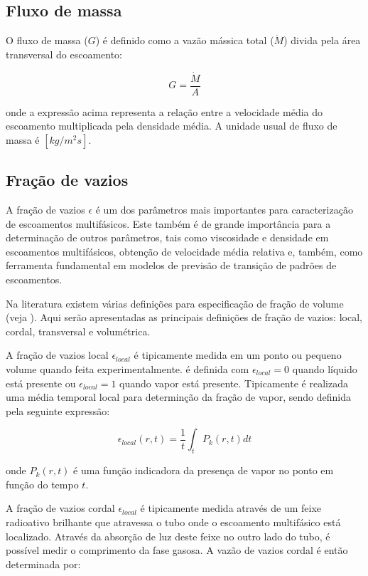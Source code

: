 \subsection{Fluxo de massa}

O fluxo de massa ($G$) é definido como a vazão mássica total ($\dot{M}$)
divida pela área transversal do escoamento:

\begin{equation}
	G = \frac{\dot{M}}{A}
\end{equation}

\noindent onde a expressão acima representa a relação entre a velocidade
média do escoamento multiplicada pela densidade média. A unidade usual
de fluxo de massa é $[kg/m^2 s]$.

\subsection{Fração de vazios}

A fração de vazios $\epsilon$ é um dos parâmetros mais importantes para
caracterização de escoamentos multifásicos. Este também é de grande
importância para a determinação de outros parâmetros, tais como
viscosidade e densidade em escoamentos multifásicos, obtenção de
velocidade média relativa e, também, como ferramenta fundamental em
modelos de previsão de transição de padrões de escoamentos. 

Na literatura existem várias definições para especificação de fração de
volume (veja \cite{thome2008}). Aqui serão apresentadas as principais
definições de fração de vazios: local, cordal, transversal e
volumétrica. 

A fração de vazios local $\epsilon_{local}$ é tipicamente medida em um
ponto ou pequeno volume quando feita experimentalmente. é definida com
$\epsilon_{local} = 0$ quando líquido está presente ou $\epsilon_{local}
= 1$ quando vapor está presente. Tipicamente é realizada uma média
temporal local para determinção da fração de vapor, sendo definida pela
seguinte expressão:

\begin{equation}
	\epsilon_{local}(r,t) 
	= 
	\frac{1}{t} \int_t P_k(r,t) dt
\end{equation}

\noindent onde $P_k(r,t)$ é uma função indicadora da presença de vapor
no ponto em função do tempo $t$.

A fração de vazios cordal $\epsilon_{local}$ é tipicamente medida
através de um feixe radioativo brilhante que atravessa o tubo onde o
escoamento multifásico está localizado. Através da absorção de luz deste
feixe no outro lado do tubo, é possível medir o comprimento da fase
gasosa. A vazão de vazios cordal é então determinada por: 

